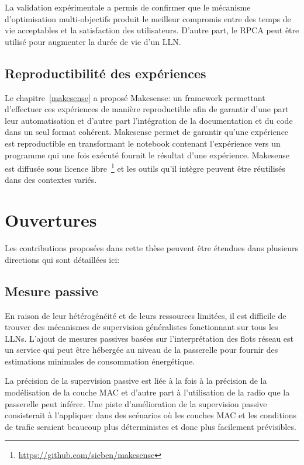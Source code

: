 La validation expérimentale a permis de confirmer que le mécanisme d'optimisation multi-objectifs produit le meilleur compromis entre des temps de vie acceptables et la satisfaction des utilisateurs. 
D'autre part, le \ac{RPCA} peut être utilisé pour augmenter la durée de vie d'un \ac{LLN}.

\subsection{Reproductibilité des expériences}

Le chapitre~\ref{makesense} a proposé Makesense: un framework permettant d'effectuer ces expériences de manière reproductible afin de garantir d'une part leur automatisation et d'autre part l'intégration de la documentation et du code dans un seul format cohérent.
Makesense permet de garantir qu'une expérience est reproductible en transformant le notebook contenant l'expérience vers un programme qui une fois exécuté fournit le résultat d'une expérience.
Makesense est diffusée sous licence libre~\footnote{\href{https://github.com/sieben/makesense}{https://github.com/sieben/makesense}} et les outils qu'il intègre peuvent être réutilisés dans des contextes variés.

\section{Ouvertures}

Les contributions proposées dans cette thèse peuvent être étendues dans plusieurs directions qui sont détaillées ici:

\subsection{Mesure passive}

En raison de leur hétérogénéité et de leurs ressources limitées, il est difficile de trouver des mécanismes de supervision généralistes fonctionnant sur tous les \ac{LLN}s.
L'ajout de mesures passives basées sur l'interprétation des flots réseau est un service qui peut être hébergée au niveau de la passerelle pour fournir des estimations minimales de consommation énergétique.

La précision de la supervision passive est liée à la fois à la précision de la modélisation de la couche MAC et d'autre part à l'utilisation de la radio que la passerelle peut inférer.
Une piste d'amélioration de la supervision passive consisterait à l'appliquer dans des scénarios où les couches \ac{MAC} et les conditions de trafic seraient beaucoup plus déterministes et donc plus facilement prévisibles.

